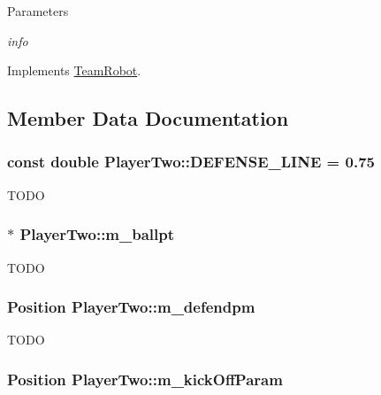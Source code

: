 \begin{DoxyParams}{Parameters}
\item[{\em info}]\end{DoxyParams}


Implements \hyperlink{classTeamRobot_a65f9a2b7464dfac3f4a0336810cf574f}{TeamRobot}.



\subsection{Member Data Documentation}
\hypertarget{classPlayerTwo_a86e1752bf84fab5d093f93633d3e51da}{
\subsubsection[{DEFENSE\_\-LINE}]{\setlength{\rightskip}{0pt plus 5cm}const double {\bf PlayerTwo::DEFENSE\_\-LINE} = 0.75}}
\label{classPlayerTwo_a86e1752bf84fab5d093f93633d3e51da}
TODO \hypertarget{classPlayerTwo_a14f2fe35deb15d4d45208273a51ec7eb}{
\subsubsection[{m\_\-ballpt}]{$\ast$ {\bf PlayerTwo::m\_\-ballpt}}}
\label{classPlayerTwo_a14f2fe35deb15d4d45208273a51ec7eb}
TODO \hypertarget{classPlayerTwo_aa6b42d687884c55d1dd30034e7952605}{
\subsubsection[{m\_\-defendpm}]{\setlength{\rightskip}{0pt plus 5cm}Position {\bf PlayerTwo::m\_\-defendpm}}}
\label{classPlayerTwo_aa6b42d687884c55d1dd30034e7952605}
TODO \hypertarget{classPlayerTwo_af294f3bef80e0df881b4452c1272376a}{
\subsubsection[{m\_\-kickOffParam}]{\setlength{\rightskip}{0pt plus 5cm}Position {\bf PlayerTwo::m\_\-kickOffParam}}}
